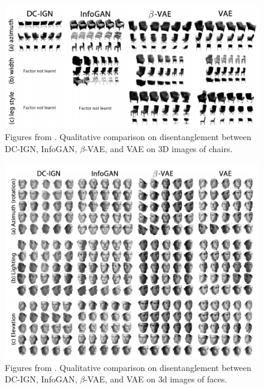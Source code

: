             \begin{figure}[H]
                \centering
                \includegraphics[width=1\textwidth]{imgs/3d_chairs.png}
                \caption{Figures from \cite{higgins2017beta}. Qualitative comparison on disentanglement between DC-IGN\citep{kulkarni2015deep}, InfoGAN\citep{chen2016infogan}, $\beta$-VAE\citep{higgins2017beta}, and VAE\citep{kingma2014adam} on 3D images of chairs.}
                \label{fig:3d_chairs}
            \end{figure}  
            
            \begin{figure}[H]
                \centering
                \includegraphics[width=1\textwidth]{imgs/3d_faces.png}
                \caption{Figures from \cite{higgins2017beta}. Qualitative comparison on disentanglement between DC-IGN\citep{kulkarni2015deep}, InfoGAN\citep{chen2016infogan}, $\beta$-VAE\citep{higgins2017beta}, and VAE\citep{kingma2014adam} on 3d images of faces.}
                \label{fig:3d_faces}
            \end{figure}  
            
